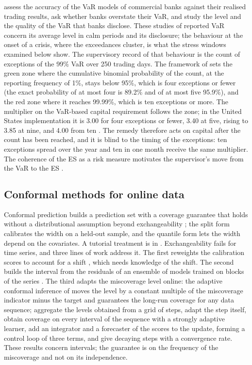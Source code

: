 \citet{berkowitz2002} assess the accuracy of the VaR models of commercial banks against their realised trading results, \citet{perignon2008} ask whether banks overstate their VaR, and \citet{perignon2010} study the level and the quality of the VaR that banks disclose. These studies of reported VaR concern its average level in calm periods and its disclosure; the behaviour at the onset of a crisis, where the exceedances cluster, is what the stress windows examined below show. The supervisory record of that behaviour is the count of exceptions of the 99\% VaR over 250 trading days. The framework of \citet{bcbs1996} sets the green zone where the cumulative binomial probability of the count, at the reporting frequency of 1\%, stays below 95\%, which is four exceptions or fewer (the exact probability of at most four is 89.2\% and of at most five 95.9\%), and the red zone where it reaches 99.99\%, which is ten exceptions or more. The multiplier on the VaR-based capital requirement follows the zone; in the United States implementation it is 3.00 for four exceptions or fewer, 3.40 at five, rising to 3.85 at nine, and 4.00 from ten \citep{cfr217204}. The remedy therefore acts on capital after the count has been reached, and it is blind to the timing of the exceptions: ten exceptions spread over the year and ten in one month receive the same multiplier. The coherence of the ES as a risk measure motivates the supervisor's move from the VaR to the ES \citep{artzner1999,acerbitasche2002}.

\subsection{Conformal methods for online data}
\label{sec:rw-conformal}

Conformal prediction builds a prediction set with a coverage guarantee that holds without a distributional assumption beyond exchangeability \citep{vovk2005}; the split form \citep{lei2018} calibrates the width on a held-out sample, and the quantile form \citep{romano2019} lets the width depend on the covariates. A tutorial treatment is in \citet{angelopoulosbates2023}. Exchangeability fails for time series, and three lines of work address it. The first reweights the calibration scores to account for a shift \citep{tibshirani2019,barber2023}, which needs knowledge of the shift. The second builds the interval from the residuals of an ensemble of models trained on blocks of the series \citep{xu2021}. The third adapts the miscoverage level online: the adaptive conformal inference of \citet{gibbs2021} moves the level by a constant multiple of the miscoverage indicator minus the target and guarantees the long-run coverage for any data sequence; \citet{zaffran2022} aggregate the levels obtained from a grid of steps, \citet{gibbs2024} adapt the step itself, \citet{bhatnagar2023} obtain coverage on every interval of the sequence with a strongly adaptive learner, \citet{angelopoulos2023} add an integrator and a forecaster of the scores to the update, forming a control loop of three terms, and \citet{angelopoulos2024} give decaying steps with a convergence rate. These results concern intervals; the guarantee is on the frequency of the miscoverage and not on its independence.

